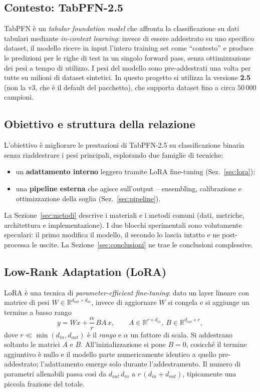 \documentclass[11pt,a4paper]{article}
\begin{document}
\subsection{Contesto: TabPFN-2.5}
TabPFN è un \emph{tabular foundation model} che affronta la classificazione su
dati tabulari mediante \emph{in-context learning}: invece di essere addestrato
su uno specifico dataset, il modello riceve in input l'intero training set come
``contesto'' e produce le predizioni per le righe di test in un singolo forward
pass, senza ottimizzazione dei pesi a tempo di utilizzo. I pesi del modello
sono pre-addestrati una volta per tutte su milioni di dataset sintetici. In
questo progetto si utilizza la versione \textbf{2.5} (non la v3, che è il
default del pacchetto), che supporta dataset fino a circa $50\,000$ campioni.

\subsection{Obiettivo e struttura della relazione}
L'obiettivo è migliorare le prestazioni di TabPFN-2.5 su classificazione binaria
senza riaddestrare i pesi principali, esplorando due famiglie di tecniche:
\begin{itemize}[nosep]
  \item un \textbf{adattamento interno} leggero tramite LoRA fine-tuning
  (Sez.~\ref{sec:lora});
  \item una \textbf{pipeline esterna} che agisce sull'output -- ensembling,
  calibrazione e ottimizzazione della soglia (Sez.~\ref{sec:pipeline}).
\end{itemize}
La Sezione~\ref{sec:metodi} descrive i materiali e i metodi comuni (dati,
metriche, architettura e implementazione). I due blocchi sperimentali sono
volutamente speculari: il primo modifica il modello, il secondo lo lascia
intatto e ne post-processa le uscite. La Sezione~\ref{sec:conclusioni} ne trae
le conclusioni complessive.

\subsection{Low-Rank Adaptation (LoRA)}
LoRA è una tecnica di \emph{parameter-efficient fine-tuning}: dato un layer
lineare con matrice di pesi $W \in \mathbb{R}^{d_{out}\times d_{in}}$, invece di
aggiornare $W$ si congela e si aggiunge un termine a basso rango
\begin{equation}
  y = Wx + \frac{\alpha}{r}\, B A\, x,
  \qquad A \in \mathbb{R}^{r\times d_{in}},\ B \in \mathbb{R}^{d_{out}\times r},
  \label{eq:lora}
\end{equation}
dove $r \ll \min(d_{in},d_{out})$ è il \emph{rango} e $\alpha$ un fattore di
scala. Si addestrano soltanto le matrici $A$ e $B$. All'inizializzazione si pone
$B = 0$, cosicché il termine aggiuntivo è nullo e il modello parte
numericamente identico a quello pre-addestrato; l'adattamento emerge solo
durante l'addestramento. Il numero di parametri allenabili passa così da
$d_{out}\,d_{in}$ a $r\,(d_{in}+d_{out})$, tipicamente una piccola frazione del
totale.
\end{document}

